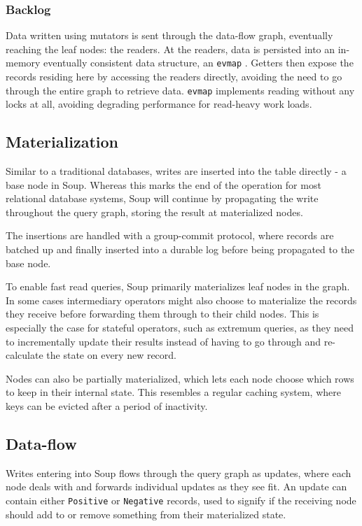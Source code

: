 \documentclass[b5paper]{report}
\begin{document}
\subsubsection{Backlog} \label{sec:readers}
Data written using mutators is sent through the data-flow graph, eventually
reaching the leaf nodes: the readers. At the readers, data is persisted into an
in-memory eventually consistent data structure, an \texttt{evmap} \cite{evmap}.
Getters then expose the records residing here by accessing the readers directly,
avoiding the need to go through the entire graph to retrieve data.
\texttt{evmap} implements reading without any locks at all, avoiding degrading
performance for read-heavy work loads.

\subsection{Materialization} \label{sec:materialization}
Similar to a traditional databases, writes are inserted into the table directly
- a base node in Soup. Whereas this marks the end of the operation for most
relational database systems, Soup will continue by propagating the write
throughout the query graph, storing the result at materialized nodes.

The insertions are handled with a group-commit protocol, where records are
batched up and finally inserted into a durable log before being propagated to
the base node.

To enable fast read queries, Soup primarily materializes leaf nodes in the
graph. In some cases intermediary operators might also choose to materialize the
records they receive before forwarding them through to their child nodes. This
is especially the case for stateful operators, such as extremum queries, as they
need to incrementally update their results instead of having to go through and
re-calculate the state on every new record.

Nodes can also be partially materialized, which lets each node choose which rows
to keep in their internal state. This resembles a regular caching system, where
keys can be evicted after a period of inactivity.

\subsection{Data-flow}
Writes entering into Soup flows through the query graph as updates,
where each node deals with and forwards individual updates as they see fit. An
update can contain either \texttt{Positive} or \texttt{Negative} records, used
to signify if the receiving node should add to or remove something from their
materialized state.
\end{document}
